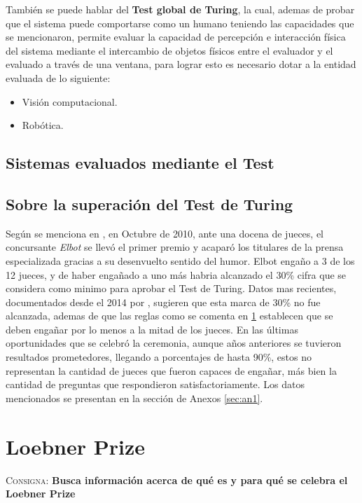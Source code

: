 \documentclass{article}
\begin{document}
Tambi\'en se puede hablar del \textbf{Test global de Turing}, la cual, ademas de probar que el sistema puede comportarse como un humano teniendo las capacidades que se mencionaron, permite evaluar la capacidad de percepci\'on e interacci\'on f\'isica del sistema mediante el intercambio de objetos f\'isicos entre el evaluador y el evaluado a trav\'es de una ventana, para lograr esto es necesario dotar a la entidad evaluada de lo siguiente:

\begin{itemize}
\item Visi\'on computacional.
\item Rob\'otica.
\end{itemize}



\subsection{Sistemas evaluados mediante el Test}


\subsection{Sobre la superaci\'on del Test de Turing}
Seg\'un se menciona en \cite{loebner2}, en Octubre de 2010, ante una docena de jueces, el concursante \textit{Elbot} se llev\'o el primer premio y acapar\'o los titulares de la prensa especializada gracias a su desenvuelto sentido del humor. Elbot enga\~no a 3 de los 12 jueces, y de haber enga\~nado a uno m\'as habria alcanzado el 30\% cifra que se considera como minimo para aprobar el Test de Turing.
Datos mas recientes, documentados desde el 2014 por \cite{loebner1}, sugieren que esta marca de 30\% no fue alcanzada, ademas de que las reglas como se comenta en \ref{sec:lp} establecen que se deben enga\~nar por lo menos a la mitad de los jueces. En las \'ultimas oportunidades que se celebr\'o la ceremonia, aunque a\~nos anteriores se tuvieron resultados prometedores, llegando a porcentajes de hasta 90\%, estos no representan la cantidad de jueces que fueron capaces de enga\~nar, m\'as bien la cantidad de preguntas que respondieron satisfactoriamente. Los datos mencionados se presentan en la secci\'on de Anexos \ref{sec:an1}.

\section{Loebner Prize}
\label{sec:lp}
\textsc{Consigna}: \textbf{Busca informaci\'on acerca de qu\'e es y para qu\'e se celebra el Loebner Prize}\\
\end{document}
